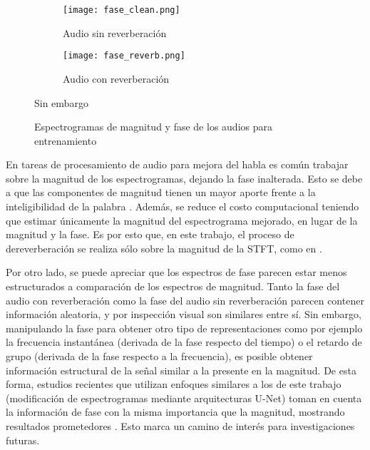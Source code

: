 \begin{figure}[H]
\centering
\begin{subfigure}{.5\textwidth}
  \centering
  \texttt{[image: fase\_clean.png]}
  \caption{Audio sin reverberación}
  \label{fig:fase_sub1}
\end{subfigure}%
\begin{subfigure}{.5\textwidth}
  \centering
  \texttt{[image: fase\_reverb.png]}
  \caption{Audio con reverberación}
  \label{fig:fase_sub2}
\end{subfigure}Sin embargo
\caption{Espectrogramas de magnitud y fase de los audios para entrenamiento}
\label{fig:fases}
\end{figure} 

En tareas de procesamiento de audio para mejora del habla es común trabajar sobre la magnitud de los espectrogramas, dejando la fase inalterada. Esto se debe a que las componentes de magnitud tienen un mayor aporte frente a la inteligibilidad de la palabra \cite{phase_book, unphase}. Además, se reduce el costo computacional teniendo que estimar únicamente la magnitud del espectrograma mejorado, en lugar de la magnitud y la fase.  Es por esto que, en este trabajo, el proceso de dereverberación se realiza sólo sobre la magnitud de la STFT, como en \cite{CNN, FCN, skip, rir_filtinverso}. 

Por otro lado, se puede apreciar que los espectros de fase parecen estar menos estructurados a comparación de los espectros de magnitud. Tanto la fase del audio con reverberación como la fase del audio sin reverberación parecen contener información aleatoria, y por inspección visual son similares entre sí. Sin embargo, manipulando la fase para obtener otro tipo de representaciones como por ejemplo la frecuencia instantánea (derivada de la fase respecto del tiempo) o el retardo de grupo (derivada de la fase respecto a la frecuencia), es posible obtener información estructural de la señal similar a la presente en la magnitud. De esta forma, estudios recientes que utilizan enfoques similares a los de este trabajo (modificación de espectrogramas mediante arquitecturas U-Net) toman en cuenta la información de fase con la misma importancia que la magnitud, mostrando resultados prometedores \cite{phaseaware}. Esto marca un camino de interés para investigaciones futuras. 

